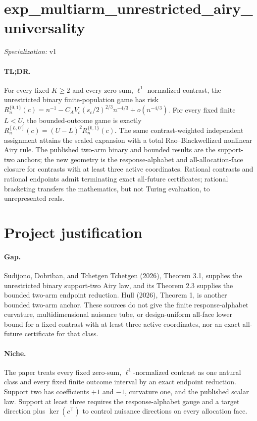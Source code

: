 \documentclass{article}
\begin{document}
\sloppy

\section*{exp\_\allowbreak{}multiarm\_\allowbreak{}unrestricted\_\allowbreak{}airy\_\allowbreak{}universality}

\noindent\textit{Specialization:} v1\par

\paragraph{TL;DR.} For every fixed \(K\ge2\) and every zero-sum, \(\ell^1\)-normalized contrast, the unrestricted binary finite-population game has risk \(R_n^{\{0,1\}}(c)=n^{-1}-C_AV_c(s_c/2)^{2/3}n^{-4/3}+o(n^{-4/3})\). For every fixed finite \(L<U\), the bounded-outcome game is exactly \(R_n^{[L,U]}(c)=(U-L)^2R_n^{\{0,1\}}(c)\). The same contrast-weighted independent assignment attains the scaled expansion with a total Rao--Blackwellized nonlinear Airy rule. The published two-arm binary and bounded results are the support-two anchors; the new geometry is the response-alphabet and all-allocation-face closure for contrasts with at least three active coordinates. Rational contrasts and rational endpoints admit terminating exact all-future certificates; rational bracketing transfers the mathematics, but not Turing evaluation, to unrepresented reals.

\section{Project justification}

\paragraph{Gap.} Sudijono, Dobriban, and Tchetgen Tchetgen (2026), Theorem 3.1, supplies the unrestricted binary support-two Airy law, and its Theorem 2.3 supplies the bounded two-arm endpoint reduction. Hull (2026), Theorem 1, is another bounded two-arm anchor. These sources do not give the finite response-alphabet curvature, multidimensional nuisance tube, or design-uniform all-face lower bound for a fixed contrast with at least three active coordinates, nor an exact all-future certificate for that class.

\paragraph{Niche.} The paper treats every fixed zero-sum, \(\ell^1\)-normalized contrast as one natural class and every fixed finite outcome interval by an exact endpoint reduction. Support two has coefficients \(+1\) and \(-1\), curvature one, and the published scalar law. Support at least three requires the response-alphabet gauge and a target direction plus \(\ker(c^\top)\) to control nuisance directions on every allocation face.
\end{document}
